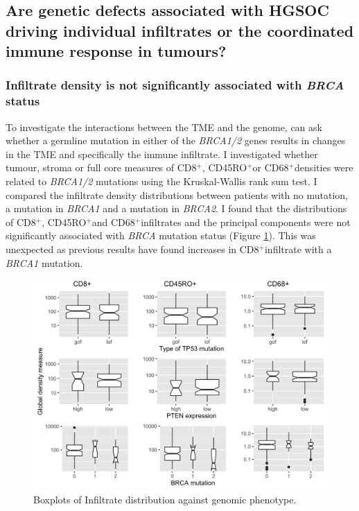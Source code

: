 \subsection{Are genetic defects associated with HGSOC driving individual infiltrates or the coordinated immune response in tumours?}

\subsubsection*{Infiltrate density is not significantly associated with \textit{BRCA} status}
To investigate the interactions between the TME and the genome, can ask whether a germline mutation in either of the \textit{BRCA1/2} genes results in changes in the TME and specifically the immune infiltrate. I investigated whether tumour, stroma or full core measures of CD8$^+$, CD45RO$^+$or CD68$^+$densities were related to \textit{BRCA1/2} mutations using the Kruskal-Wallis rank sum test. I compared the infiltrate density distributions between patients with no mutation, a mutation in \textit{BRCA1} and a mutation in \textit{BRCA2}. I found that the distributions of CD8$^+$, CD45RO$^+$and CD68$^+$infiltrates and the principal components were not significantly associated with \textit{BRCA} mutation status (Figure \ref{fig:genomic}). This was unexpected as previous results have found increases in CD8$^+$infiltrate with a \textit{BRCA1} mutation\cite{Clarke2009}.

\begin{figure}
    \centering
    \includegraphics[width=\textwidth]{Chapter2/Figs/Raster/genomic.png}
    \caption{Boxplots of Infiltrate distribution against genomic phenotype.}
    \label{fig:genomic}
\end{figure}

